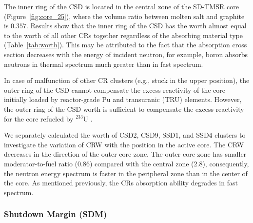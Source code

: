 The inner ring of the CSD is located in the central zone of the SD-TMSR core 
(Figure~\ref{fig:core_25}), where the volume ratio between molten salt and 
graphite is $0.357$. Results show that the inner ring of the CSD has 
the worth almost equal to the worth of all other CRs together regardless of 
the absorbing material type (Table~\ref{tab:worth}). This may be attributed to 
the fact that the absorption cross section decreases with the energy of 
incident neutron, for example, boron absorbs neutrons in thermal spectrum much 
greater than in fast spectrum.

In case of malfunction of other CR clusters (e.g., stuck in the upper 
position), the outer ring of the CSD cannot compensate the excess 
reactivity of the core initially loaded by reactor-grade Pu and transuranic 
(TRU) elements. However, the outer ring of the CSD worth is sufficient 
to compensate the excess reactivity for the core refueled by $^{233}$U . 

We separately calculated the worth of CSD2, CSD9, SSD1, and SSD4 clusters to 
investigate the variation of CRW with the position in the active core.
The CRW decreases in the direction of the outer core zone. The outer core zone 
has smaller moderator-to-fuel ratio ($0.86$) compared with the central zone 
($2.8$), consequently, the neutron energy spectrum is faster in the peripheral 
zone than in the center of the core. As mentioned previously, the CRs 
absorption ability degrades in fast spectrum.

\subsubsection{Shutdown Margin (SDM)}


